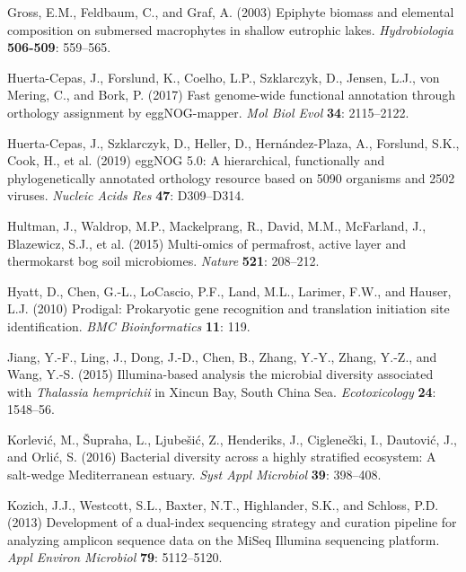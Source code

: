 \documentclass[12pt,]{article}
\begin{document}
\leavevmode\hypertarget{ref-Gross2003}{}%
Gross, E.M., Feldbaum, C., and Graf, A. (2003) Epiphyte biomass and
elemental composition on submersed macrophytes in shallow eutrophic
lakes. \emph{Hydrobiologia} \textbf{506-509}: 559--565.

\leavevmode\hypertarget{ref-Huerta-Cepas2017}{}%
Huerta-Cepas, J., Forslund, K., Coelho, L.P., Szklarczyk, D., Jensen,
L.J., von Mering, C., and Bork, P. (2017) Fast genome-wide functional
annotation through orthology assignment by eggNOG-mapper. \emph{Mol Biol
Evol} \textbf{34}: 2115--2122.

\leavevmode\hypertarget{ref-Huerta-Cepas2019}{}%
Huerta-Cepas, J., Szklarczyk, D., Heller, D., Hernández-Plaza, A.,
Forslund, S.K., Cook, H., et al. (2019) eggNOG 5.0: A hierarchical,
functionally and phylogenetically annotated orthology resource based on
5090 organisms and 2502 viruses. \emph{Nucleic Acids Res} \textbf{47}:
D309--D314.

\leavevmode\hypertarget{ref-Hultman2015}{}%
Hultman, J., Waldrop, M.P., Mackelprang, R., David, M.M., McFarland, J.,
Blazewicz, S.J., et al. (2015) Multi-omics of permafrost, active layer
and thermokarst bog soil microbiomes. \emph{Nature} \textbf{521}:
208--212.

\leavevmode\hypertarget{ref-Hyatt2010}{}%
Hyatt, D., Chen, G.-L., LoCascio, P.F., Land, M.L., Larimer, F.W., and
Hauser, L.J. (2010) Prodigal: Prokaryotic gene recognition and
translation initiation site identification. \emph{BMC Bioinformatics}
\textbf{11}: 119.

\leavevmode\hypertarget{ref-Jiang2015}{}%
Jiang, Y.-F., Ling, J., Dong, J.-D., Chen, B., Zhang, Y.-Y., Zhang,
Y.-Z., and Wang, Y.-S. (2015) Illumina-based analysis the microbial
diversity associated with \emph{Thalassia hemprichii} in Xincun Bay,
South China Sea. \emph{Ecotoxicology} \textbf{24}: 1548--56.

\leavevmode\hypertarget{ref-Korlevic2016}{}%
Korlević, M., Šupraha, L., Ljubešić, Z., Henderiks, J., Ciglenečki, I.,
Dautović, J., and Orlić, S. (2016) Bacterial diversity across a highly
stratified ecosystem: A salt-wedge Mediterranean estuary. \emph{Syst
Appl Microbiol} \textbf{39}: 398--408.

\leavevmode\hypertarget{ref-Kozich2013}{}%
Kozich, J.J., Westcott, S.L., Baxter, N.T., Highlander, S.K., and
Schloss, P.D. (2013) Development of a dual-index sequencing strategy and
curation pipeline for analyzing amplicon sequence data on the MiSeq
Illumina sequencing platform. \emph{Appl Environ Microbiol} \textbf{79}:
5112--5120.
\end{document}
